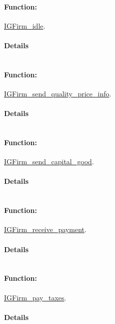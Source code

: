 \documentclass[a4paper,11pt]{article}
\begin{document}
\paragraph{Function:}\url{IGFirm_idle}.

\paragraph{Details}
\begin{verbatim}
\end{verbatim}
\paragraph{Function:}\url{IGFirm_send_quality_price_info}.

\paragraph{Details}
\begin{verbatim}
\end{verbatim}
\paragraph{Function:}\url{IGFirm_send_capital_good}.

\paragraph{Details}
\begin{verbatim}
\end{verbatim}
\paragraph{Function:}\url{IGFirm_receive_payment}.

\paragraph{Details}
\begin{verbatim}
\end{verbatim}
\paragraph{Function:}\url{IGFirm_pay_taxes}.

\paragraph{Details}
\begin{verbatim}
\end{verbatim}
\end{document}
